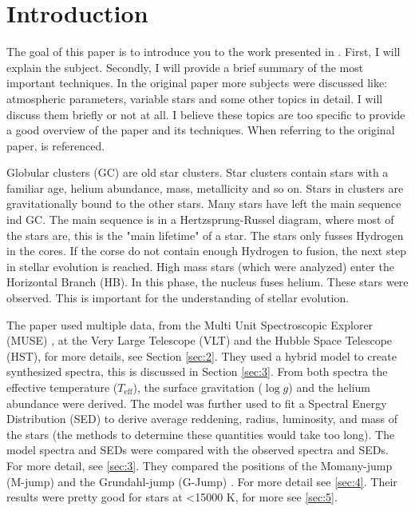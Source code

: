 \documentclass{aa}
\begin{document}

\section{Introduction}
\label{sec:1}
The goal of this paper is to introduce you to the work presented in \cite{2023A&A...677A..86L}. First, I will explain the subject. Secondly, I will provide a brief summary of the most important techniques. In the original paper more subjects were discussed like: atmospheric parameters, variable stars and some other topics in detail. I will discuss them briefly or not at all. I believe these topics are too specific to provide a good overview of the paper and its techniques. When referring to the original paper, \cite{2023A&A...677A..86L} is referenced. 

Globular clusters (GC) are old star clusters. Star clusters contain stars with a familiar age, helium abundance, mass, metallicity and so on. Stars in clusters are gravitationally bound to the other stars. Many stars have left the main sequence ind GC. The main sequence is in a Hertzsprung-Russel diagram, where most of the stars are, this is the "main lifetime" of a star. The stars only fusses Hydrogen in the cores. If the corse do not contain enough Hydrogen to fusion, the next step in stellar evolution is reached. High mass stars (which were analyzed) enter the Horizontal Branch (HB). In this phase, the nucleus fuses helium. These stars were observed. This is important for the understanding of stellar evolution.

The paper \cite{2023A&A...677A..86L} used multiple data, from the Multi Unit Spectroscopic Explorer (MUSE) \citep{2010SPIE.7735E..08B}, at the Very Large Telescope (VLT) and the Hubble Space Telescope (HST), for more details, see Section \ref{sec:2}. They used a hybrid model to create synthesized spectra, this is discussed in Section \ref{sec:3}. From both spectra the effective temperature ($T_{\text{eff}}$), the surface gravitation ($\log{g}$) and the helium abundance were derived. The model was further used to fit a Spectral Energy Distribution (SED) to derive average reddening, radius, luminosity, and mass of the stars (the methods to determine these quantities would take too long). The model spectra and SEDs were compared with the observed spectra and SEDs. For more detail, see \ref{sec:3}. They compared the positions of the Momany-jump (M-jump) \citep{2002ApJ...576L..65M} and the Grundahl-jump (G-Jump) \citep{1999ApJ...524..242G}. For more detail see \ref{sec:4}. Their results were pretty good for stars at <15000 K, for more see \ref{sec:5}. 
\end{document}
